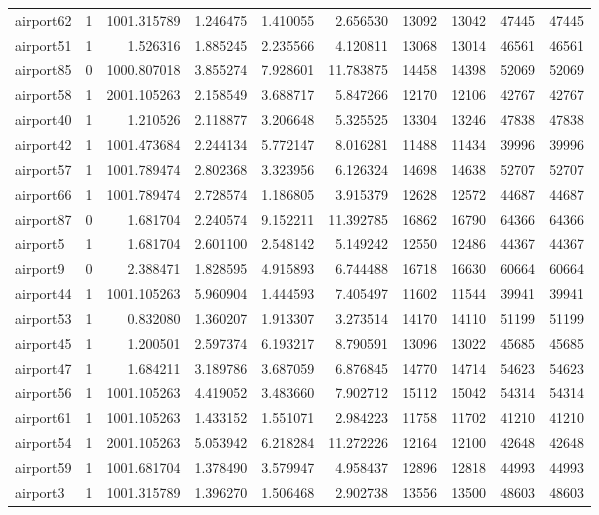 \begin{longtable}{|l|r|r|r|r|r|r|r|r|r|}
airport62 & 1 & 1001.315789 & 1.246475 & 1.410055 & 2.656530 & 13092 & 13042 & 47445 & 47445 \\
airport51 & 1 & 1.526316 & 1.885245 & 2.235566 & 4.120811 & 13068 & 13014 & 46561 & 46561 \\
airport85 & 0 & 1000.807018 & 3.855274 & 7.928601 & 11.783875 & 14458 & 14398 & 52069 & 52069 \\
airport58 & 1 & 2001.105263 & 2.158549 & 3.688717 & 5.847266 & 12170 & 12106 & 42767 & 42767 \\
airport40 & 1 & 1.210526 & 2.118877 & 3.206648 & 5.325525 & 13304 & 13246 & 47838 & 47838 \\
airport42 & 1 & 1001.473684 & 2.244134 & 5.772147 & 8.016281 & 11488 & 11434 & 39996 & 39996 \\
airport57 & 1 & 1001.789474 & 2.802368 & 3.323956 & 6.126324 & 14698 & 14638 & 52707 & 52707 \\
airport66 & 1 & 1001.789474 & 2.728574 & 1.186805 & 3.915379 & 12628 & 12572 & 44687 & 44687 \\
airport87 & 0 & 1.681704 & 2.240574 & 9.152211 & 11.392785 & 16862 & 16790 & 64366 & 64366 \\
airport5 & 1 & 1.681704 & 2.601100 & 2.548142 & 5.149242 & 12550 & 12486 & 44367 & 44367 \\
airport9 & 0 & 2.388471 & 1.828595 & 4.915893 & 6.744488 & 16718 & 16630 & 60664 & 60664 \\
airport44 & 1 & 1001.105263 & 5.960904 & 1.444593 & 7.405497 & 11602 & 11544 & 39941 & 39941 \\
airport53 & 1 & 0.832080 & 1.360207 & 1.913307 & 3.273514 & 14170 & 14110 & 51199 & 51199 \\
airport45 & 1 & 1.200501 & 2.597374 & 6.193217 & 8.790591 & 13096 & 13022 & 45685 & 45685 \\
airport47 & 1 & 1.684211 & 3.189786 & 3.687059 & 6.876845 & 14770 & 14714 & 54623 & 54623 \\
airport56 & 1 & 1001.105263 & 4.419052 & 3.483660 & 7.902712 & 15112 & 15042 & 54314 & 54314 \\
airport61 & 1 & 1001.105263 & 1.433152 & 1.551071 & 2.984223 & 11758 & 11702 & 41210 & 41210 \\
airport54 & 1 & 2001.105263 & 5.053942 & 6.218284 & 11.272226 & 12164 & 12100 & 42648 & 42648 \\
airport59 & 1 & 1001.681704 & 1.378490 & 3.579947 & 4.958437 & 12896 & 12818 & 44993 & 44993 \\
airport3 & 1 & 1001.315789 & 1.396270 & 1.506468 & 2.902738 & 13556 & 13500 & 48603 & 48603 \\

\end{longtable}
